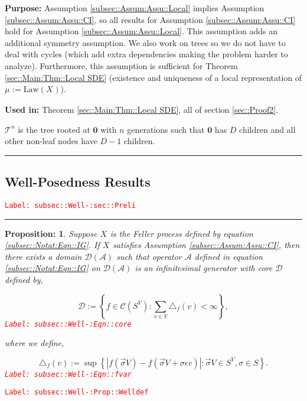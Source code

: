 \documentclass[12pt]{article}
\newcommand{\mc}{\mathcal}
\newcommand{\te}{\text}
\newcommand{\ep}{\epsilon}
\newcommand{\tr}{\textcolor{red}}
\newcommand{\labe}[1]{\tr{\texttt{Label: #1}}}
\newcommand{\purpose}{\textbf{Purpose: }}
\newcommand{\usein}{\textbf{Used in: }}
\newcommand{\ind}{\hspace{24pt}}
\newcommand{\lin}{\rule{\linewidth}{0.4 pt}}
\newcommand{\defeq}{:=}								%
\renewcommand{\root}{\mathbf{0}}				%
\renewcommand{\v}{v}							%
\renewcommand{\S}{S}							%
\newcommand{\s}{\sigma}							%
\newcommand{\sv}{\vec{\s}}						%
\newcommand{\ev}{\ep}							%
\newcommand{\degr}{D}								%
\newcommand{\IG}{\mc{A}}						%
\newcommand{\law}{\te{Law}}							%
\newcommand{\tree}{\mc{T}}							%
\newcommand{\core}{\mc{D}}							%
\newcommand{\V}{V}									%
\newcommand{\numb}{n}								%
\newcommand{\XState}[1]{\S^{#1}}				%
\newcommand{\rxvts}[2]{X_{#1}{#2}}					%
\newcommand{\m}[3]{\mu_{#2#1}^{#3}}						%
\newcommand{\cont}{\mc{C}}							%
\newtheorem{prop}[thms]{Proposition: }
\begin{document}
\purpose Assumption \ref{subsec::Assum:Assu::Local} implies Assumption \ref{subsec::Assum:Assu::CI}, so all results for Assumption \ref{subsec::Assum:Assu::CI} hold for Assumption \ref{subsec::Assum:Assu::Local}. This assumption adds an additional symmetry assumption. We also work on trees so we do not have to deal with cycles (which add extra dependencies making the problem harder to analyze). Furthermore, this assumption is sufficient for Theorem \ref{sec::Main:Thm::Local SDE} (existence and uniqueness of a local representation of \(\m{}{}{} \defeq \law(\rxvts{}{})\)).

\usein Theorem \ref{sec::Main:Thm::Local SDE}, all of section \ref{sec::Proof2}.

\ind \(\tree^\numb\) is the tree rooted at \(\root\) with \(\numb\) generations such that \(\root\) has \(\degr\) children and all other non-leaf nodes have \(\degr-1\) children.

\lin

\subsection{Well-Posedness Results}
\label{subsec::Well-:sec::Preli}\labe{subsec::Well-:sec::Preli}

\rule{\linewidth}{0.4 pt}

\begin{prop}
Suppose \(\rxvts{}{}\) is the Feller process defined by equation \eqref{subsec::Notat:Eqn::IG}. If \(\rxvts{}{}\) satisfies Assumption \ref{subsec::Assum:Assu::CI}, then there exists a domain \(\core(\IG)\) such that operator \(\IG\) defined in equation \eqref{subsec::Notat:Eqn::IG} on \(\mc{D}(\IG)\) is an infinitesimal generator with core \(\core\) defined by,

\begin{equation}
\core \defeq \left\{f \in \cont(\S^\V): \sum_{\v\in\V} \triangle_f(\v) < \infty\right\},
\label{subsec::Well-:Eqn::core}
\end{equation}
\labe{subsec::Well-:Eqn::core}

where we define,

\begin{equation}
\triangle_f(\v) \defeq \sup\left\{|f(\sv{}{\V}) - f(\sv{}{\V}+\s\ev{\v})|: \sv{}{\V} \in \S^\V,\s \in \S\right\}.
\label{subsec::Well-:Eqn::fvar}
\end{equation}
\labe{subsec::Well-:Eqn::fvar}

\label{subsec::Well-:Prop::Welldef}
\end{prop}
\labe{subsec::Well-:Prop::Welldef}
\end{document}
